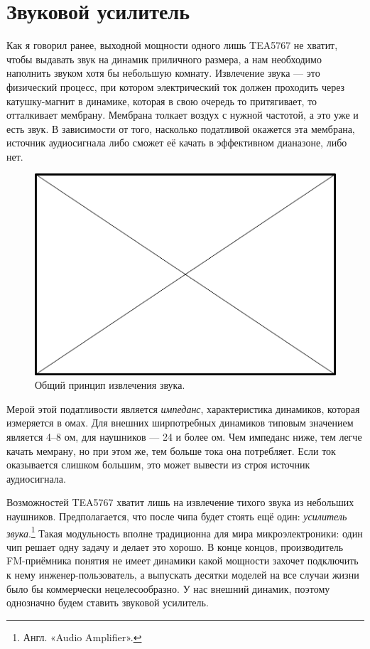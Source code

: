 \section{Звуковой усилитель}

Как я говорил ранее, выходной мощности одного лишь TEA5767 не хватит, чтобы выдавать звук на динамик приличного размера, а нам необходимо наполнить звуком хотя бы небольшую комнату. Извлечение звука — это физический процесс, при котором электрический ток должен проходить через катушку-магнит в динамике, которая в свою очередь то притягивает, то отталкивает мембрану. Мембрана толкает воздух с нужной частотой, а это уже и есть звук. В зависимости от того, насколько податливой окажется эта мембрана, источник аудиосигнала либо сможет её качать в эффективном дианазоне, либо нет.

\begin{figure}
  \centering
  \includegraphics{TODO.png}
  \caption{Общий принцип извлечения звука.}
\end{figure}

Мерой этой податливости является \emph{импеданс}, характеристика динамиков, которая измеряется в омах. Для внешних ширпотребных динамиков типовым значением является 4--8 ом, для наушников — 24 и более ом. Чем импеданс ниже, тем легче качать мемрану, но при этом же, тем больше тока она потребляет. Если ток оказывается слишком большим, это может вывести из строя источник аудиосигнала.

Возможностей TEA5767 хватит лишь на извлечение тихого звука из небольших наушников. Предполагается, что после чипа будет стоять ещё один: \emph{усилитель звука}.\footnote{Англ. «Audio Amplifier».} Такая модульность вполне традиционна для мира микроэлектроники: один чип решает одну задачу и делает это хорошо. В конце концов, производитель FM-приёмника понятия не имеет динамики какой мощности захочет подключить к нему инженер-пользователь, а выпускать десятки моделей на все случаи жизни было бы коммерчески нецелесообразно. У нас внешний динамик, поэтому однозначно будем ставить звуковой усилитель.

